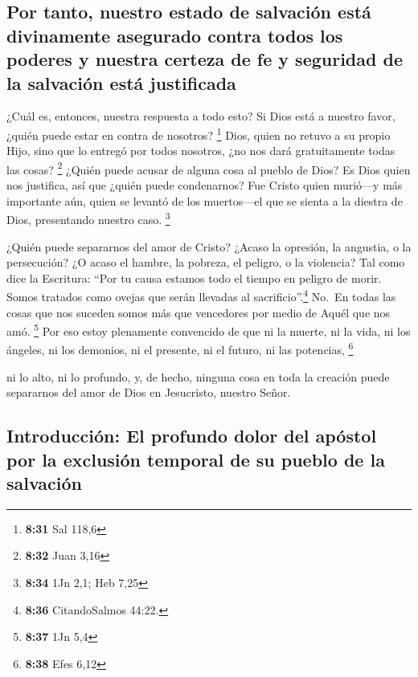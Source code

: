 \hypertarget{por-tanto-nuestro-estado-de-salvaciuxf3n-estuxe1-divinamente-asegurado-contra-todos-los-poderes-y-nuestra-certeza-de-fe-y-seguridad-de-la-salvaciuxf3n-estuxe1-justificada}{%
\subsection{Por tanto, nuestro estado de salvación está divinamente
asegurado contra todos los poderes y nuestra certeza de fe y seguridad
de la salvación está
justificada}\label{por-tanto-nuestro-estado-de-salvaciuxf3n-estuxe1-divinamente-asegurado-contra-todos-los-poderes-y-nuestra-certeza-de-fe-y-seguridad-de-la-salvaciuxf3n-estuxe1-justificada}}

 ¿Cuál es, entonces, nuestra respuesta a todo esto? Si
Dios está a nuestro favor, ¿quién puede estar en contra de nosotros?
\footnote{\textbf{8:31} Sal 118,6}  Dios, quien no retuvo
a su propio Hijo, sino que lo entregó por todos nosotros, ¿no nos dará
gratuitamente todas las cosas? \footnote{\textbf{8:32} Juan 3,16}
 ¿Quién puede acusar de alguna cosa al pueblo de Dios? Es
Dios quien nos justifica,  así que ¿quién puede
condenarnos? Fue Cristo quien murió---y más importante aún, quien se
levantó de los muertos---el que se sienta a la diestra de Dios,
presentando nuestro caso. \footnote{\textbf{8:34} 1Jn 2,1; Heb 7,25}

 ¿Quién puede separarnos del amor de Cristo? ¿Acaso la
opresión, la angustia, o la persecución? ¿O acaso el hambre, la pobreza,
el peligro, o la violencia?  Tal como dice la Escritura:
``Por tu causa estamos todo el tiempo en peligro de morir. Somos
tratados como ovejas que serán llevadas al sacrificio''.\footnote{\textbf{8:36}
  CitandoSalmos 44:22.}  No.~En todas las cosas que nos
suceden somos más que vencedores por medio de Aquél que nos amó.
\footnote{\textbf{8:37} 1Jn 5,4}  Por eso estoy
plenamente convencido de que ni la muerte, ni la vida, ni los ángeles,
ni los demonios, ni el presente, ni el futuro, ni las potencias,
\footnote{\textbf{8:38} Efes 6,12}

 ni lo alto, ni lo profundo, y, de hecho, ninguna cosa en
toda la creación puede separarnos del amor de Dios en Jesucristo,
nuestro Señor.

\hypertarget{introducciuxf3n-el-profundo-dolor-del-apuxf3stol-por-la-exclusiuxf3n-temporal-de-su-pueblo-de-la-salvaciuxf3n}{%
\subsection{Introducción: El profundo dolor del apóstol por la exclusión
temporal de su pueblo de la
salvación}\label{introducciuxf3n-el-profundo-dolor-del-apuxf3stol-por-la-exclusiuxf3n-temporal-de-su-pueblo-de-la-salvaciuxf3n}}

